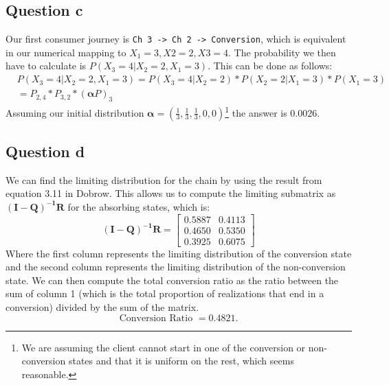 \documentclass[11pt, a4paper]{article}
\begin{document}
\subsection{Question c}
Our first consumer journey is \verb|Ch 3 -> Ch 2 -> Conversion|, which is equivalent in our numerical mapping to $X_1 = 3, X2 = 2, X3 = 4$.
The probability we then have to calculate is $P(X_3 = 4|X_2=2, X_1 = 3)$. This can be done as follows:
\begin{align*}
	&P(X_3 = 4|X_2=2, X_1 = 3) = P(X_3 = 4 | X_2 = 2) * P(X_2 = 2 | X_1 = 3) * P(X_1 = 3) \\
	&= P_{2,4} * P_{3,2} * (\bm{\alpha}P)_3
\end{align*}
Assuming our initial distribution $\bm{\alpha} = (\frac{1}{3}, \frac{1}{3}, \frac{1}{3}, 0, 0)$\footnote{We are assuming the client cannot start in one of the conversion or non-conversion states and that it is uniform on the rest, which seems reasonable.} the answer is $0.0026$.

\subsection{Question d}
We can find the limiting distribution for the chain by using the result from equation 3.11 in Dobrow. This allows us to compute the limiting submatrix as $ \bm{(I-Q)^{-1}R}$ for the absorbing states, which is:
\[
	\bm{(I-Q)^{-1}R} = \begin{bmatrix}
		0.5887 & 0.4113 \\
		0.4650 & 0.5350 \\
		0.3925 & 0.6075
	\end{bmatrix}
\]
Where the first column represents the limiting distribution of the conversion state and the second column represents the limiting distribution of the non-conversion state. 
We can then compute the total conversion ratio as the ratio between the sum of column 1 (which is the total proportion of realizations that end in a conversion) divided by the sum of the matrix.
\[
	\text{Conversion Ratio }  = 0.4821.
\]
\end{document}
